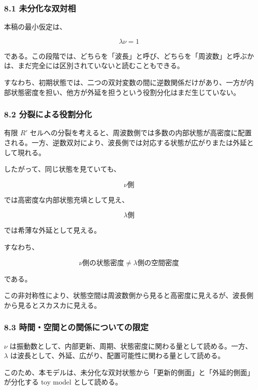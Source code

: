 \documentclass[
]{ltjsarticle}
\begin{document}
\subsubsection{8.1
未分化な双対相}\label{ux672aux5206ux5316ux306aux53ccux5bfeux76f8}

本稿の最小仮定は、

\[
\lambda\nu=1
\]

である。この段階では、どちらを「波長」と呼び、どちらを「周波数」と呼ぶかは、まだ完全には区別されていないと読むこともできる。

すなわち、初期状態では、二つの双対変数の間に逆数関係だけがあり、一方が内部状態密度を担い、他方が外延を担うという役割分化はまだ生じていない。

\subsubsection{8.2
分裂による役割分化}\label{ux5206ux88c2ux306bux3088ux308bux5f79ux5272ux5206ux5316}

有限 \(R'\)
セルへの分裂を考えると、周波数側では多数の内部状態が高密度に配置される。一方、逆数双対により、波長側では対応する状態が広がりまたは外延として現れる。

したがって、同じ状態を見ていても、

\[
\nu\text{側}
\]

では高密度な内部状態充填として見え、

\[
\lambda\text{側}
\]

では希薄な外延として見える。

すなわち、

\[
\nu\text{側の状態密度}\ne\lambda\text{側の空間密度}
\]

である。

この非対称性により、状態空間は周波数側から見ると高密度に見えるが、波長側から見るとスカスカに見える。

\subsubsection{8.3
時間・空間との関係についての限定}\label{ux6642ux9593ux7a7aux9593ux3068ux306eux95a2ux4fc2ux306bux3064ux3044ux3066ux306eux9650ux5b9a}

\(\nu\)
は振動数として、内部更新、周期、状態密度に関わる量として読める。一方、\(\lambda\)
は波長として、外延、広がり、配置可能性に関わる量として読める。

このため、本モデルは、未分化な双対状態から「更新的側面」と「外延的側面」が分化する
toy model として読める。
\end{document}
